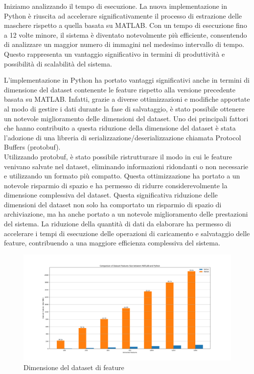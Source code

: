 \documentclass[a4paper,12pt]{report}
\begin{document}
    Iniziamo analizzando il tempo di esecuzione. La nuova implementazione in Python è riuscita ad accelerare significativamente il processo di estrazione delle maschere rispetto a quella basata su MATLAB. Con un tempo di esecuzione fino a 12 volte minore, il sistema è diventato notevolmente più efficiente, consentendo di analizzare un maggior numero di immagini nel medesimo intervallo di tempo. Questo rappresenta un vantaggio significativo in termini di produttività e possibilità di scalabilità del sistema.
    
  

    L'implementazione in Python ha portato vantaggi significativi anche in termini di dimensione del dataset contenente le feature rispetto alla versione precedente basata su MATLAB. Infatti, grazie a diverse ottimizzazioni e modifiche apportate al modo di gestire i dati durante la fase di salvataggio, è stato possibile ottenere un notevole miglioramento delle dimensioni del dataset.
    Uno dei principali fattori che hanno contribuito a questa riduzione della dimensione del dataset è stata l'adozione di una libreria di serializzazione/deserializzazione chiamata Protocol Buffers (protobuf).
    \\
    Utilizzando protobuf, è stato possibile ristrutturare il modo in cui le feature venivano salvate nel dataset, eliminando informazioni ridondanti o non necessarie e utilizzando un formato più compatto. Questa ottimizzazione ha portato a un notevole risparmio di spazio e ha permesso di ridurre considerevolmente la dimensione complessiva del dataset.
    Questa significativa riduzione delle dimensioni del dataset non solo ha comportato un risparmio di spazio di archiviazione, ma ha anche portato a un notevole miglioramento delle prestazioni del sistema. La riduzione della quantità di dati da elaborare ha permesso di accelerare i tempi di esecuzione delle operazioni di caricamento e salvataggio delle feature, contribuendo a una maggiore efficienza complessiva del sistema.
    
    \begin{figure}[H]
      \centering
      \includegraphics[width=\textwidth]{assets/images/results/result_dataset_size.png}   
      \caption{Dimensione del dataset di feature}
    \end{figure}
\end{document}
